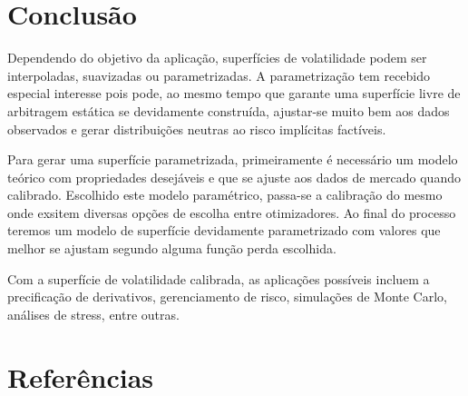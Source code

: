 \documentclass[]{book}
\begin{document}
\section{Conclusão}\label{conclusao-1}

Dependendo do objetivo da aplicação, superfícies de volatilidade podem
ser interpoladas, suavizadas ou parametrizadas. A parametrização tem
recebido especial interesse pois pode, ao mesmo tempo que garante uma
superfície livre de arbitragem estática se devidamente construída,
ajustar-se muito bem aos dados observados e gerar distribuições neutras
ao risco implícitas factíveis.

Para gerar uma superfície parametrizada, primeiramente é necessário um
modelo teórico com propriedades desejáveis e que se ajuste aos dados de
mercado quando calibrado. Escolhido este modelo paramétrico, passa-se a
calibração do mesmo onde exsitem diversas opções de escolha entre
otimizadores. Ao final do processo teremos um modelo de superfície
devidamente parametrizado com valores que melhor se ajustam segundo
alguma função perda escolhida.

Com a superfície de volatilidade calibrada, as aplicações possíveis
incluem a precificação de derivativos, gerenciamento de risco,
simulações de Monte Carlo, análises de stress, entre outras.

\section{Referências}\label{referencias}


\end{document}
